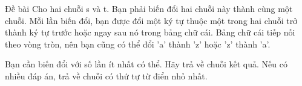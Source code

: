 Đề bài
Cho hai chuỗi s và t. Bạn phải biến đổi hai chuỗi này thành cùng một chuỗi. Mỗi lần biến đổi, bạn được đổi một ký tự thuộc một trong hai chuỗi trở thành ký tự trước hoặc ngay sau nó trong bảng chữ cái. Bảng chữ cái tiếp nối theo vòng tròn, nên bạn cũng có thể đổi 'a' thành 'z' hoặc 'z' thành 'a'.  

   Bạn cần biến đổi với số lần ít nhất có thể. Hãy trả về chuỗi kết quả. Nếu có nhiều đáp án, trả về chuỗi có thứ tự từ điển nhỏ nhất.